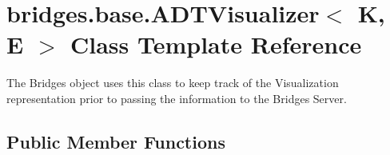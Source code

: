 \hypertarget{classbridges_1_1base_1_1_a_d_t_visualizer}{}\section{bridges.\+base.\+A\+D\+T\+Visualizer$<$ K, E $>$ Class Template Reference}
\label{classbridges_1_1base_1_1_a_d_t_visualizer}


The Bridges object uses this class to keep track of the Visualization representation prior to passing the information to the Bridges Server.  


\subsection*{Public Member Functions}
